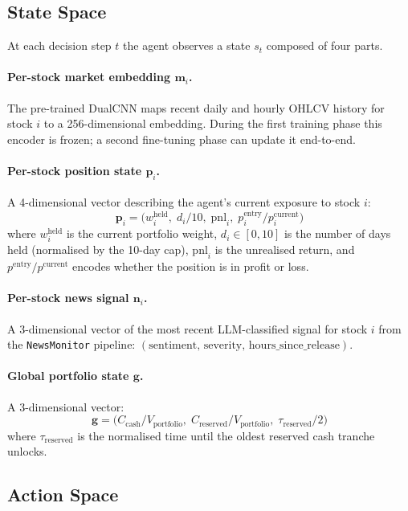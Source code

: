 \documentclass[11pt, a4paper]{article}
\begin{document}
\subsection{State Space}

At each decision step $t$ the agent observes a state $s_t$ composed of four
parts.

\paragraph{Per-stock market embedding $\mathbf{m}_i$.}
The pre-trained DualCNN maps recent daily and hourly OHLCV history for stock
$i$ to a 256-dimensional embedding. During the first training phase this
encoder is frozen; a second fine-tuning phase can update it end-to-end.

\paragraph{Per-stock position state $\mathbf{p}_i$.}
A 4-dimensional vector describing the agent's current exposure to stock $i$:
\[
    \mathbf{p}_i = \bigl(w_i^\text{held},\; d_i / 10,\; \mathrm{pnl}_i,\;
                         p_i^\text{entry} / p_i^\text{current}\bigr)
\]
where $w_i^\text{held}$ is the current portfolio weight, $d_i \in [0,10]$ is
the number of days held (normalised by the 10-day cap), $\mathrm{pnl}_i$ is
the unrealised return, and $p^\text{entry}/p^\text{current}$ encodes whether
the position is in profit or loss.

\paragraph{Per-stock news signal $\mathbf{n}_i$.}
A 3-dimensional vector of the most recent LLM-classified signal for stock $i$
from the \texttt{NewsMonitor} pipeline:
$(\text{sentiment},\, \text{severity},\, \text{hours\_since\_release})$.

\paragraph{Global portfolio state $\mathbf{g}$.}
A 3-dimensional vector:
\[
    \mathbf{g} = \bigl(C_\text{cash} / V_\text{portfolio},\;
                       C_\text{reserved} / V_\text{portfolio},\;
                       \tau_\text{reserved} / 2\bigr)
\]
where $\tau_\text{reserved}$ is the normalised time until the oldest reserved
cash tranche unlocks.

\subsection{Action Space}
\end{document}
